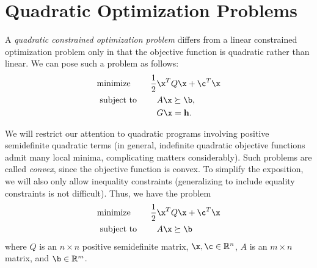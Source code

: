 \def\Mu{\boldsymbol{\mu}}
\def\Lamb{\boldsymbol{\lambda}}



\section*{Quadratic Optimization Problems}
A \emph{quadratic constrained optimization problem} differs from a linear constrained optimization problem only in that the objective function is quadratic rather than linear.
We can pose such a problem as follows:
\begin{align*}
\text{minimize }\qquad \frac{1}{2}&\x^TQ\x + \c^T\x\\
\text{subject to }\qquad &A\x \succeq \b,\\
&G\x = \mathbf{h}.
\end{align*}

We will restrict our attention to quadratic programs involving positive semidefinite quadratic terms (in general, indefinite quadratic objective functions admit many local minima, complicating matters considerably).
Such problems are called \emph{convex}, since the objective function is convex.
To simplify the exposition, we will also only allow inequality constraints (generalizing to include equality constraints is not difficult).
Thus, we have the problem
\begin{align*}
\text{minimize }\qquad \frac{1}{2}&\x^TQ\x + \c^T\x\\
\text{subject to }\qquad &A\x \succeq \b\\
\end{align*}
where $Q$ is an $n\times n$ positive semidefinite matrix, $\x, \c \in \mathbb{R}^n$, $A$ is an $m \times n$ matrix,
and $\b \in \mathbb{R}^m$.


